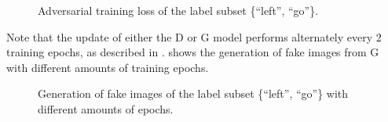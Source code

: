 \begin{figure}[!ht]
  \centering
  \caption{Adversarial training loss of the label subset \{\enquote{left}, \enquote{go}\}.}
  \label{fig:nn_adv_loss_label}
\end{figure}
\FloatBarrier
\noindent
Note that the update of either the D or G model performs alternately every 2 training epochs, as described in .
 shows the generation of fake images from G with different amounts of training epochs.
\begin{figure}[!ht]
  \centering
  \caption{Generation of fake images of the label subset \{\enquote{left}, \enquote{go}\} with different amounts of epochs.}
  \label{fig:nn_adv_fakes_label}
\end{figure}
